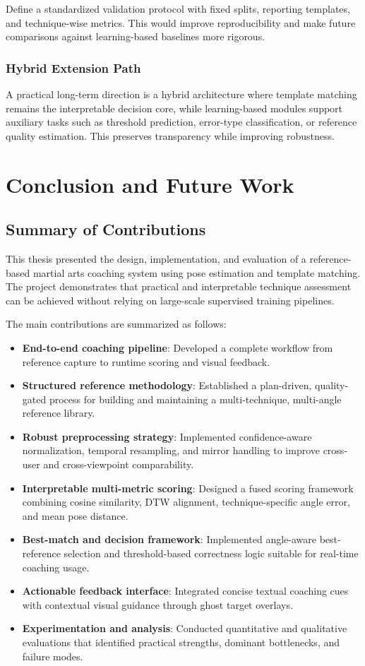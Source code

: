 \documentclass[12pt]{article}
\begin{document}
{Define a standardized validation protocol with fixed splits, reporting templates, and technique-wise metrics. This would improve reproducibility and make future comparisons against learning-based baselines more rigorous.

\subsubsection{Hybrid Extension Path}

A practical long-term direction is a hybrid architecture where template matching remains the interpretable decision core, while learning-based modules support auxiliary tasks such as threshold prediction, error-type classification, or reference quality estimation. This preserves transparency while improving robustness.

\section{Conclusion and Future Work}
\subsection{Summary of Contributions}

This thesis presented the design, implementation, and evaluation of a reference-based martial arts coaching system using pose estimation and template matching. The project demonstrates that practical and interpretable technique assessment can be achieved without relying on large-scale supervised training pipelines.

The main contributions are summarized as follows:

\begin{itemize}
    \item \textbf{End-to-end coaching pipeline}: Developed a complete workflow from reference capture to runtime scoring and visual feedback.
    \item \textbf{Structured reference methodology}: Established a plan-driven, quality-gated process for building and maintaining a multi-technique, multi-angle reference library.
    \item \textbf{Robust preprocessing strategy}: Implemented confidence-aware normalization, temporal resampling, and mirror handling to improve cross-user and cross-viewpoint comparability.
    \item \textbf{Interpretable multi-metric scoring}: Designed a fused scoring framework combining cosine similarity, DTW alignment, technique-specific angle error, and mean pose distance.
    \item \textbf{Best-match and decision framework}: Implemented angle-aware best-reference selection and threshold-based correctness logic suitable for real-time coaching usage.
    \item \textbf{Actionable feedback interface}: Integrated concise textual coaching cues with contextual visual guidance through ghost target overlays.
    \item \textbf{Experimentation and analysis}: Conducted quantitative and qualitative evaluations that identified practical strengths, dominant bottlenecks, and failure modes.
\end{itemize}

}
\end{document}
